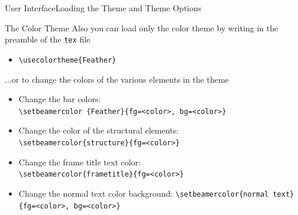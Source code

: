 \documentclass[10pt]{beamer}
\begin{document}
\begin{frame}{User Interface}{Loading the Theme and Theme Options}

  \begin{block}{The Color Theme}
    Also you can load only the color theme by writing in the preamble of the {\tt tex} file 
    
    \vspace{5pt} 
    
    \begin{itemize}
    \item {\tt \textbackslash usecolortheme\{Feather\}}
    \end{itemize}
    
    \vspace{5pt}
    
    ...or to change the colors of the various elements in the theme
    
    \vspace{5pt} 
    \begin{itemize}
    \item Change the bar colors: \\    
    {\tt \textbackslash setbeamercolor \{Feather\}\{fg=<color>, bg=<color>\}}
    
    \vspace{2pt} 
    
    \item Change the color of the structural elements: \\    
    {\tt \textbackslash setbeamercolor\{structure\}\{fg=<color>\}}
    
    \vspace{2pt} 
    
    \item Change the frame title text color:\\
    {\tt \textbackslash setbeamercolor\{frametitle\}\{fg=<color>\}}
    
    \vspace{2pt} 
    
    \item Change the normal text color background:    
    {\tt \textbackslash setbeamercolor\{normal text\}\{fg=<color>, bg=<color>\}}
    \end{itemize}
  \end{block}
\end{frame}


\end{document}
